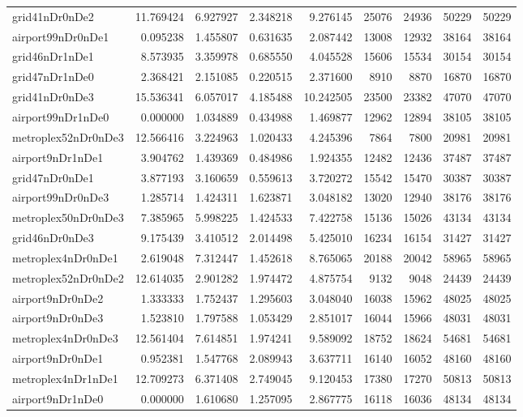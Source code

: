 \begin{longtable}{|l|r|r|r|r|r|r|r|r|}
grid41nDr0nDe2 & 11.769424 & 6.927927 & 2.348218 & 9.276145 & 25076 & 24936 & 50229 & 50229 \\
airport99nDr0nDe1 & 0.095238 & 1.455807 & 0.631635 & 2.087442 & 13008 & 12932 & 38164 & 38164 \\
grid46nDr1nDe1 & 8.573935 & 3.359978 & 0.685550 & 4.045528 & 15606 & 15534 & 30154 & 30154 \\
grid47nDr1nDe0 & 2.368421 & 2.151085 & 0.220515 & 2.371600 & 8910 & 8870 & 16870 & 16870 \\
grid41nDr0nDe3 & 15.536341 & 6.057017 & 4.185488 & 10.242505 & 23500 & 23382 & 47070 & 47070 \\
airport99nDr1nDe0 & 0.000000 & 1.034889 & 0.434988 & 1.469877 & 12962 & 12894 & 38105 & 38105 \\
metroplex52nDr0nDe3 & 12.566416 & 3.224963 & 1.020433 & 4.245396 & 7864 & 7800 & 20981 & 20981 \\
airport9nDr1nDe1 & 3.904762 & 1.439369 & 0.484986 & 1.924355 & 12482 & 12436 & 37487 & 37487 \\
grid47nDr0nDe1 & 3.877193 & 3.160659 & 0.559613 & 3.720272 & 15542 & 15470 & 30387 & 30387 \\
airport99nDr0nDe3 & 1.285714 & 1.424311 & 1.623871 & 3.048182 & 13020 & 12940 & 38176 & 38176 \\
metroplex50nDr0nDe3 & 7.385965 & 5.998225 & 1.424533 & 7.422758 & 15136 & 15026 & 43134 & 43134 \\
grid46nDr0nDe3 & 9.175439 & 3.410512 & 2.014498 & 5.425010 & 16234 & 16154 & 31427 & 31427 \\
metroplex4nDr0nDe1 & 2.619048 & 7.312447 & 1.452618 & 8.765065 & 20188 & 20042 & 58965 & 58965 \\
metroplex52nDr0nDe2 & 12.614035 & 2.901282 & 1.974472 & 4.875754 & 9132 & 9048 & 24439 & 24439 \\
airport9nDr0nDe2 & 1.333333 & 1.752437 & 1.295603 & 3.048040 & 16038 & 15962 & 48025 & 48025 \\
airport9nDr0nDe3 & 1.523810 & 1.797588 & 1.053429 & 2.851017 & 16044 & 15966 & 48031 & 48031 \\
metroplex4nDr0nDe3 & 12.561404 & 7.614851 & 1.974241 & 9.589092 & 18752 & 18624 & 54681 & 54681 \\
airport9nDr0nDe1 & 0.952381 & 1.547768 & 2.089943 & 3.637711 & 16140 & 16052 & 48160 & 48160 \\
metroplex4nDr1nDe1 & 12.709273 & 6.371408 & 2.749045 & 9.120453 & 17380 & 17270 & 50813 & 50813 \\
airport9nDr1nDe0 & 0.000000 & 1.610680 & 1.257095 & 2.867775 & 16118 & 16036 & 48134 & 48134 \\

\end{longtable}
